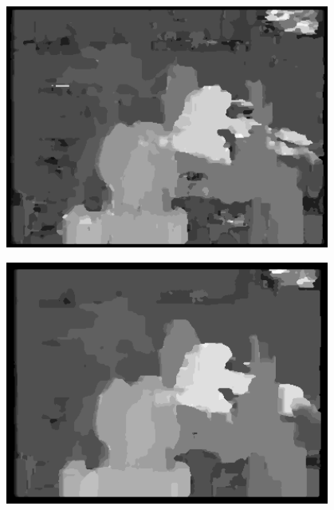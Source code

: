 \documentclass[a4paper]{scrartcl}
\begin{document}
\vspace{1cm}
\begin{minipage}{0.8\textwidth}
  \centering
  \includegraphics[width=0.8\textwidth]{images/disparity-r4-ssd-d20-m1.png}
  \label{fig:disparity-r4-ssd-d20-m1}
\end{minipage}

\vspace{1cm}
\begin{minipage}{0.8\textwidth}
  \centering
  \includegraphics[width=0.8\textwidth]{images/disparity-r8-ssd-d20-m1.png}
  \label{fig:disparity-r8-ssd-d20-m1}
\end{minipage}
\end{document}
